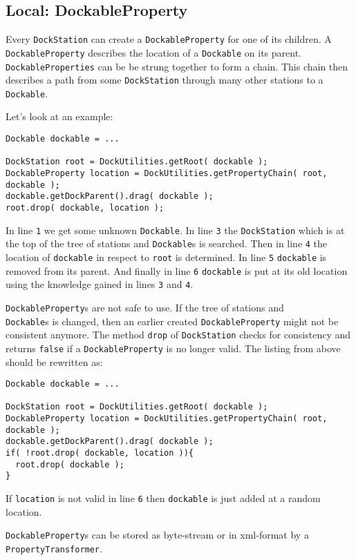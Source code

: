 \documentclass[a4paper,10pt]{article}
\newcommand{\src}[1]{\lstinline[basicstyle=\normalsize\ttfamily,keywordstyle=\normalsize\ttfamily,identifierstyle=\normalsize\ttfamily]|#1|}
\begin{document}
\subsection{Local: DockableProperty}
Every \src{DockStation} can create a \src{DockableProperty} for one of its children. A \src{DockableProperty} describes the location of a \src{Dockable} on its parent. \\\src{DockableProperties} can be be strung together to form a chain. This chain then describes a path from some \src{DockStation} through many other stations to a \src{Dockable}.

Let's look at an example:
\begin{lstlisting}
Dockable dockable = ...

DockStation root = DockUtilities.getRoot( dockable );
DockableProperty location = DockUtilities.getPropertyChain( root, dockable );
dockable.getDockParent().drag( dockable );
root.drop( dockable, location );
\end{lstlisting}
In line \src{1} we get some unknown \src{Dockable}. In line \src{3} the \src{DockStation} which is at the top of the tree of stations and \src{Dockable}s is searched. Then in line \src{4} the location of \src{dockable} in respect to \src{root} is determined. In line \src{5} \src{dockable} is removed from its parent. And finally in line \src{6} \src{dockable} is put at its old location using the knowledge gained in lines \src{3} and \src{4}.

\src{DockableProperty}s are not safe to use. If the tree of stations and \\\src{Dockable}s is changed, then an earlier created \src{DockableProperty} might not be consistent anymore. The method \src{drop} of \src{DockStation} checks for consistency and returns \src{false} if a \src{DockableProperty} is no longer valid. The listing from above should be rewritten as:
\begin{lstlisting}
Dockable dockable = ...

DockStation root = DockUtilities.getRoot( dockable );
DockableProperty location = DockUtilities.getPropertyChain( root, dockable );
dockable.getDockParent().drag( dockable );
if( !root.drop( dockable, location )){
  root.drop( dockable );
}
\end{lstlisting}
If \src{location} is not valid in line \src{6} then \src{dockable} is just added at a random location.

\src{DockableProperty}s can be stored as byte-stream or in xml-format by a \src{PropertyTransformer}.
\end{document}
